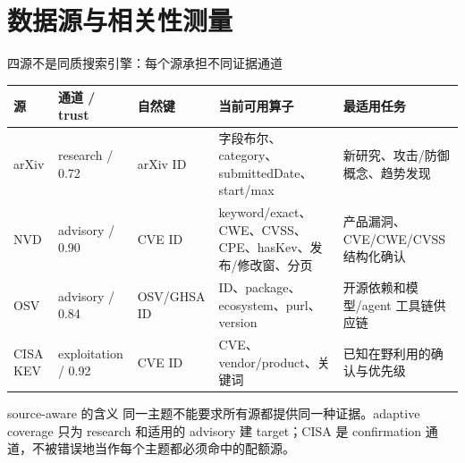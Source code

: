 \section{数据源与相关性测量}

\begin{frame}{四源不是同质搜索引擎：每个源承担不同证据通道}
\scriptsize
\begin{tabularx}{\textwidth}{p{} p{} p{} X X}
\toprule
源 & 通道 / trust & 自然键 & 当前可用算子 & 最适用任务 \\
\midrule
arXiv & research / 0.72 & arXiv ID & 字段布尔、category、submittedDate、start/max & 新研究、攻击/防御概念、趋势发现 \\
NVD & advisory / 0.90 & CVE ID & keyword/exact、CWE、CVSS、CPE、hasKev、发布/修改窗、分页 & 产品漏洞、CVE/CWE/CVSS 结构化确认 \\
OSV & advisory / 0.84 & OSV/GHSA ID & ID、package、ecosystem、purl、version & 开源依赖和模型/agent 工具链供应链 \\
CISA KEV & exploitation / 0.92 & CVE ID & CVE、vendor/product、关键词 & 已知在野利用的确认与优先级 \\
\bottomrule
\end{tabularx}

\vspace{0.6em}
\begin{block}{source-aware 的含义}
同一主题不能要求所有源都提供同一种证据。adaptive coverage 只为 research 和适用的 advisory 建 target；CISA 是 confirmation 通道，不被错误地当作每个主题都必须命中的配额源。
\end{block}
\end{frame}

